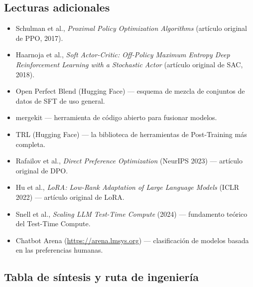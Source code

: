 \documentclass[a4paper]{article}
\begin{document}
\subsection{Lecturas adicionales}
\begin{itemize}
    \item Schulman et al., \textit{Proximal Policy Optimization Algorithms} (artículo original de PPO, 2017).
    \item Haarnoja et al., \textit{Soft Actor-Critic: Off-Policy Maximum Entropy Deep Reinforcement Learning with a Stochastic Actor} (artículo original de SAC, 2018).
    \item Open Perfect Blend (Hugging Face) — esquema de mezcla de conjuntos de datos de SFT de uso general.
    \item mergekit — herramienta de código abierto para fusionar modelos.
    \item TRL (Hugging Face) — la biblioteca de herramientas de Post-Training más completa.
    \item Rafailov et al., \textit{Direct Preference Optimization} (NeurIPS 2023) — artículo original de DPO.
    \item Hu et al., \textit{LoRA: Low-Rank Adaptation of Large Language Models} (ICLR 2022) — artículo original de LoRA.
    \item Snell et al., \textit{Scaling LLM Test-Time Compute} (2024) — fundamento teórico del Test-Time Compute.
    \item Chatbot Arena (\url{https://arena.lmsys.org}) — clasificación de modelos basada en las preferencias humanas.
\end{itemize}

\subsection{Tabla de síntesis y ruta de ingeniería}
\end{document}
